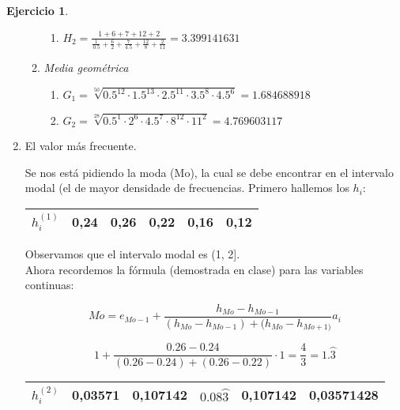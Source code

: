\documentclass[a4paper, 12pt]{article}
\theoremstyle{definition}
\newtheorem{ej}{Ejercicio}
\begin{document}
\begin{ej}
\begin{enumerate}[label=\textit{\alph*)}]
\begin{enumerate}[label=]
\begin{enumerate}[label=\arabic*.]
            \item \(H_2 = \frac{1+6+7+12+2}{\frac{1}{0.5} + \frac{6}{2} + \frac{7}{4.5} + \frac{12}{8} + \frac{2}{11}} = 3.399141631\)
        \end{enumerate}
        
        \item \textit{Media geométrica}
        \begin{enumerate}[label=\arabic*.]
            \item \(G_1 = \sqrt[50]{0.5^{12} \cdot 1.5^{13} \cdot 2.5^{11} \cdot 3.5^8 \cdot 4.5^6} = 1.684688918\)
            
            \item \(G_2 = \sqrt[28]{0.5^1 \cdot 2^6 \cdot 4.5^7 \cdot 8^{12} \cdot 11^2} = 4.769603117\)
        \end{enumerate}
    \end{enumerate}
    
    \item El valor más frecuente.
    
    Se nos está pidiendo la moda (Mo), la cual se debe encontrar en el intervalo modal (el de mayor densidade de frecuencias. Primero hallemos los \(h_i\):
    \begin{center}
        \begin{tabular}{|c|c|c|c|c|c|}
        \hline
             \(h_i^{(1)}\) & 0,24 & 0,26 & 0,22 & 0,16 & 0,12 \\
        \hline
        \end{tabular}
    \end{center}
    
    Observamos que el intervalo modal es (1, 2]. \\
    Ahora recordemos la fórmula (demostrada en clase) para las variables continuas:
    
    \begin{equation}\label{eqn:moda_continua}
        Mo = e_{Mo-1} + \frac{h_{Mo} - h_{Mo-1}}{(h_{Mo} - h_{Mo-1}) + (h_{Mo} - h_{Mo+1)}}a_i
    \end{equation}
    
    \[
    1 + \frac{0.26 - 0.24}{(0.26-0.24) + (0.26 - 0.22)} \cdot 1 = \frac{4}{3} = 1.\wideparen{3}
    \]
    
    \begin{center}
        \begin{tabular}{|c|c|c|c|c|c|}
        \hline
             \(h_i^{(2)}\) & 0,03571 & 0,107142 & \(0.08\wideparen{3}\) & 0,107142 & 0,03571428 \\
        \hline
        \end{tabular}
    \end{center}
    

\end{enumerate}
\end{ej}
\end{document}
